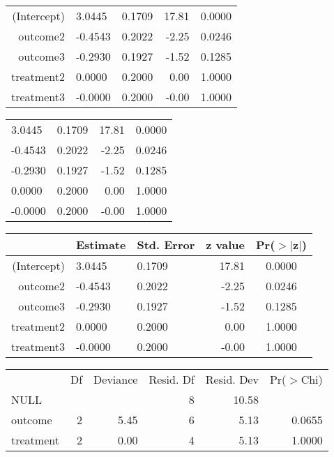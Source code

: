 \begin{table}[ht]
\centering
\begin{tabular}{r||llrc}
  \hline
  \hline
(Intercept) & 3.0445 & 0.1709 & 17.81 & 0.0000 \\ 
  outcome2 & -0.4543 & 0.2022 & -2.25 & 0.0246 \\ 
  outcome3 & -0.2930 & 0.1927 & -1.52 & 0.1285 \\ 
  treatment2 & 0.0000 & 0.2000 & 0.00 & 1.0000 \\ 
  treatment3 & -0.0000 & 0.2000 & -0.00 & 1.0000 \\ 
   \hline
\end{tabular}
\end{table}
\begin{table}[ht]
\centering
\begin{tabular}{||llrc}
  \hline
  \hline
3.0445 & 0.1709 & 17.81 & 0.0000 \\ 
  -0.4543 & 0.2022 & -2.25 & 0.0246 \\ 
  -0.2930 & 0.1927 & -1.52 & 0.1285 \\ 
  0.0000 & 0.2000 & 0.00 & 1.0000 \\ 
  -0.0000 & 0.2000 & -0.00 & 1.0000 \\ 
   \hline
\end{tabular}
\end{table}
\begin{table}[ht]
\centering
\begin{tabular}{|r||llrc|}
  \hline
 & Estimate & Std. Error & z value & Pr($>$$|$z$|$) \\ 
  \hline
(Intercept) & 3.0445 & 0.1709 & 17.81 & 0.0000 \\ 
  outcome2 & -0.4543 & 0.2022 & -2.25 & 0.0246 \\ 
  outcome3 & -0.2930 & 0.1927 & -1.52 & 0.1285 \\ 
  treatment2 & 0.0000 & 0.2000 & 0.00 & 1.0000 \\ 
  treatment3 & -0.0000 & 0.2000 & -0.00 & 1.0000 \\ 
   \hline
\end{tabular}
\end{table}
\begin{table}[ht]
\centering
\begingroup\small
\begin{tabular}{lrrrrr}
  & Df & Deviance & Resid. Df & Resid. Dev & Pr($>$Chi) \\ 
 NULL &  &  & 8 & 10.58 &  \\ 
   \hline
outcome & 2 & 5.45 & 6 & 5.13 & 0.0655 \\ 
  treatment & 2 & 0.00 & 4 & 5.13 & 1.0000 \\ 
  \end{tabular}
\endgroup
\end{table}
